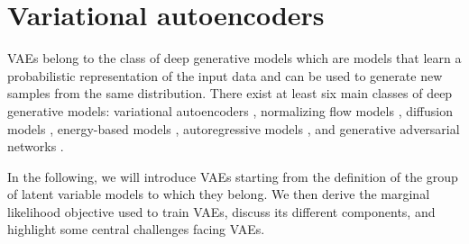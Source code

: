 \section{Variational autoencoders}

VAEs belong to the class of deep generative models which are models that learn a probabilistic representation of the input data and can be used to generate new samples from the same distribution. 
There exist at least six main classes of deep generative models: variational autoencoders \parencite{kingma_autoencoding_2014,rezende_stochastic_2014,ranganath_hierarchical_2016,vahdat_nvae_2020,child_very_2021}, normalizing flow models \parencite{dinh_nice_2015,rezende_variational_2015,dinh_density_2017,kingma_glow_2018,grathwohl_ffjord_2018}, diffusion models \parencite{sohl-dickstein_deep_2015,song_generative_2019, ho_denoising_2020, vahdat_scorebased_2021}, energy-based models \parencite{lecun_tutorial_2006,hinton_fast_2006,salakhutdinov_efficient_2010,du_implicit_2019}, autoregressive models \parencite{oord_conditional_2016,oord_wavenet_2016,radford_improving_2018}, and generative adversarial networks \parencite{goodfellow_generative_2014,arjovsky_wasserstein_2017,brock_large_2019,karras_stylebased_2019}. 

In the following, we will introduce VAEs starting from the definition of the group of latent variable models to which they belong. We then derive the marginal likelihood objective used to train VAEs, discuss its different components, and highlight some central challenges facing VAEs.


